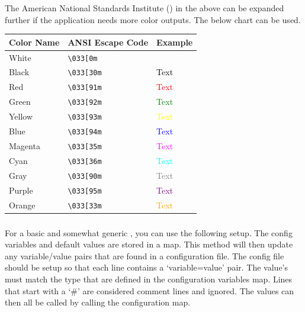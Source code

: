 \begin{fancybox}{1}
The American National Standards Institute ()  in the above can be expanded further if the application needs more color outputs. The below chart can be used.
	\begin{longtable}{|l|l|l|}
	\hline
	\textbf{Color Name} & \textbf{ANSI Escape Code} & \textbf{Example} \\
	\hline
	White & \texttt{\textbackslash 033[0m} & \textcolor{white}{Text} \\
	\hline
	Black & \texttt{\textbackslash 033[30m} & \textcolor{black}{Text} \\
	\hline
	Red & \texttt{\textbackslash 033[91m} & \textcolor{red}{Text} \\
	\hline
	Green & \texttt{\textbackslash 033[92m} & \textcolor{green}{Text} \\
	\hline
	Yellow & \texttt{\textbackslash 033[93m} & \textcolor{yellow}{Text} \\
	\hline
	Blue & \texttt{\textbackslash 033[94m} & \textcolor{blue}{Text} \\
	\hline
	Magenta & \texttt{\textbackslash 033[35m} & \textcolor{magenta}{Text} \\
	\hline
	Cyan & \texttt{\textbackslash 033[36m} & \textcolor{cyan}{Text} \\
	\hline
	Gray & \texttt{\textbackslash 033[90m} & \textcolor{gray}{Text} \\
	\hline
	Purple & \texttt{\textbackslash 033[95m} & \textcolor{purple}{Text} \\
	\hline
	Orange & \texttt{\textbackslash 033[33m} & \textcolor{orange}{Text} \\
	\hline
	\end{longtable}
\end{fancybox}














\subsubsection{}

For a basic and somewhat generic  , you can use the following setup. The config variables and default values are stored in a map. This method will then update any variable/value pairs that are found in a configuration file. The config file should be setup so that each line contains a `variable=value' pair. The value's must match the type that are defined in the configuration variables map. Lines that start with a `\#' are considered comment lines and ignored. The values can then all be called by calling the configuration map.

